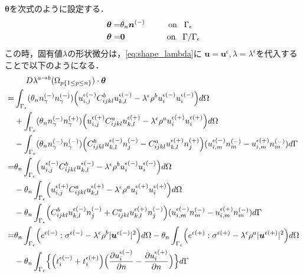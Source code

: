 $\bm{\theta}$を次式のように設定する．
\begin{align}
	\bm{\theta}=&\theta_{n}\bm{n}^{(-)}	\hspace{1cm}\text{on}\hspace{0.3cm}\Gamma_{\epsilon}\\
	\bm{\theta}=&\bm{0}					\hspace{1.8cm}\text{on}\hspace{0.3cm}\Gamma/\Gamma_{\epsilon}
\end{align}
この時，固有値$\lambda$の形状微分は，\eqref{eq:shape_lambda}に
$\bm{u}=\bm{u}^{\epsilon},\lambda=\lambda^{\epsilon}$を代入することで以下のようになる．
\begin{align}
	&\hspace{0.5cm}D\lambda^{a\rightarrow b}(\Omega_{p\{1\leq p\leq n\}})\cdot\bm{\theta}
	\nonumber
	\\
	=&\int_{\Gamma_\epsilon}(\theta_{n}n_{\gamma}^{(-)}n_{\gamma}^{(-)})
	\Bigr(u_{i,j}^{\epsilon(-)}C_{ijkl}^{b}u_{k,l}^{\epsilon(-)}
	-\lambda^{\epsilon}\rho^{b}u_{i}^{\epsilon(-)}u_{i}^{\epsilon(-)}\Bigl) d\Omega
	\nonumber
	\\
	&+\int_{\Gamma_\epsilon}(\theta_{n}n_{\gamma}^{(-)}n_{\gamma}^{(+)})
	\Bigr(u_{i,j}^{\epsilon(+)}C_{ijkl}^{a}u_{k,l}^{\epsilon(+)}
	-\lambda^{\epsilon}\rho^{a}u_{i}^{\epsilon(+)}u_{i}^{\epsilon(+)}\Bigl) d\Omega
	\nonumber
	\\
	&-\int_{\Gamma_{\epsilon}}(\theta_{n}n_{\gamma}^{(-)}n_{\gamma}^{(-)})
	\Bigr(C_{ijkl}^{b}u_{k,l}^{\epsilon(-)}n_{j}^{(-)}
	-C_{ijkl}^{a}u_{k,l}^{\epsilon(+)}n_{j}^{(+)}\Bigl)
	(u_{i,m}^{\epsilon(-)}n_{m}^{(-)}-u_{i,m}^{\epsilon(+)}n_{m}^{(-)}) d\Gamma
	\nonumber
	\\
	=&\theta_{n}\int_{\Gamma_\epsilon}
	\Bigr(u_{i,j}^{\epsilon(-)}C_{ijkl}^{b}u_{k,l}^{\epsilon(-)}
	-\lambda^{\epsilon}\rho^{b}u_{i}^{\epsilon(-)}u_{i}^{\epsilon(-)}\Bigl) d\Omega
	\nonumber
	\\
	&-\theta_{n}\int_{\Gamma_\epsilon}
	\Bigr(u_{i,j}^{\epsilon(+)}C_{ijkl}^{a}u_{k,l}^{\epsilon(+)}
	-\lambda^{\epsilon}\rho^{a}u_{i}^{\epsilon(+)}u_{i}^{\epsilon(+)}\Bigl) d\Omega
	\nonumber
	\\
	&-\theta_{n}\int_{\Gamma_{\epsilon}}
	\Bigr(C_{ijkl}^{b}u_{k,l}^{\epsilon(-)}n_{j}^{(-)}
	+C_{ijkl}^{a}u_{k,l}^{\epsilon(+)}n_{j}^{(-)}\Bigl)
	(u_{i,m}^{\epsilon(-)}n_{m}^{(-)}-u_{i,m}^{\epsilon(+)}n_{m}^{(-)}) d\Gamma
	\label{eq:SDForTD}
	\\
	=&\theta_{n}\int_{\Gamma_\epsilon}
	\Bigr(e^{\epsilon(-)}:\sigma^{\epsilon(-)}
	-\lambda^{\epsilon}\rho^{b}|\bm{u}^{\epsilon(-)}|^{2}\Bigl) d\Omega
	-\theta_{n}\int_{\Gamma_\epsilon}
		\Bigr(e^{\epsilon(+)}:\sigma^{\epsilon(+)}
		-\lambda^{\epsilon}\rho^{a}|\bm{u}^{\epsilon(+)}|^{2}\Bigl) d\Omega
	\nonumber
	\\
	&-\theta_{n}\int_{\Gamma_{\epsilon}}\Bigl\{
	\Bigr(t_{i}^{\epsilon(-)}+t_{i}^{\epsilon(+)}\Bigl)
		\Bigl(\frac{\partial u_{i}^{\epsilon(-)}}{\partial n}-\frac{\partial u_{i}^{\epsilon(+)}}{\partial n}\Bigr)
	\Bigl\}d\Gamma
	\label{eq:SDForTDRTh}
\end{align}

